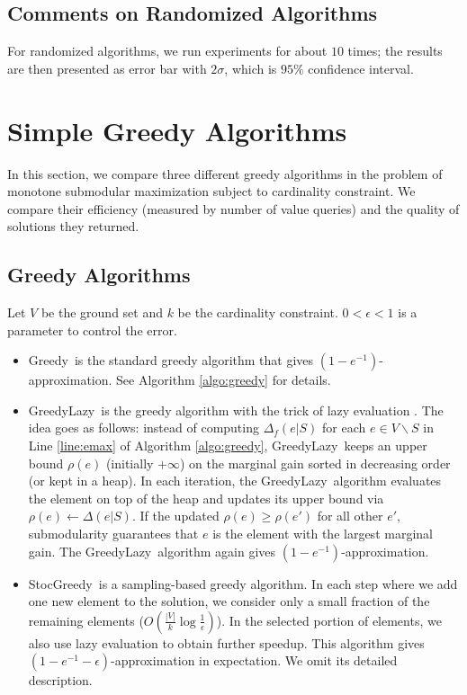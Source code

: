 \documentclass[11pt]{article}
\newcommand{\eps}{\epsilon}
\newcommand{\greedy}{{\sc Greedy}~}
\newcommand{\greedyLazy}{{\sc GreedyLazy}~}
\newcommand{\stocGreedy}{{\sc StocGreedy}~}
\begin{document}
\subsection{Comments on Randomized Algorithms}
For randomized algorithms, we run experiments for about $10$ times; the results are then presented as error bar with $2\sigma$,  which is $95\%$ confidence interval. 

\section{Simple Greedy Algorithms}
\label{sec:greedy}
In this section, we compare three different greedy algorithms in the problem of monotone submodular maximization subject to cardinality constraint. We compare their efficiency (measured by number of value queries) and the quality of solutions they returned.
\subsection{Greedy Algorithms}
Let $V$ be the ground set and $k$ be the cardinality constraint. $ 0 < \eps < 1$ is a parameter to control the error.
\begin{itemize}
\item \greedy is the standard greedy algorithm that gives $(1 - e^{-1})$-approximation.  See Algorithm \ref{algo:greedy} for details.
\item \greedyLazy is the greedy algorithm with the trick of lazy evaluation \cite{M78}. The idea goes as follows: instead of computing $\Delta_f(e|S)$ for each $e\in V\backslash S$ in Line \ref{line:emax} of Algorithm \ref{algo:greedy},  \greedyLazy keeps an upper bound $\rho(e)$ (initially $+\infty$) on the marginal gain sorted in decreasing order (or kept in a heap). In each iteration, the \greedyLazy algorithm evaluates the element on top of the heap and updates its upper bound via $\rho(e) \gets \Delta(e|S)$. If the updated $\rho(e) \geq \rho(e')$ for all other $e'$, submodularity guarantees that $e$ is the element with the largest marginal gain. The \greedyLazy algorithm again gives $(1 - e^{-1})$-approximation.
\item \stocGreedy is a sampling-based greedy algorithm. In each step where we add one new element to the solution, we consider only a small fraction of the remaining elements ($O(\frac{|V|}{k}\log \frac{1}{\eps})$). In the selected portion of elements, we also use lazy evaluation to obtain further speedup. This algorithm gives $(1 - e^{-1} - \eps)$-approximation in expectation. We omit its detailed description.
\end{itemize}
\end{document}
